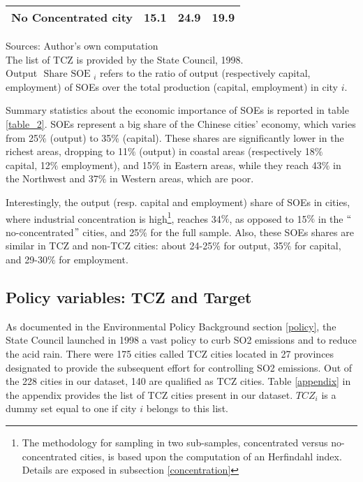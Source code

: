 \documentclass[12pt]{article}
\begin{document}
\begin{table}[!htb]
\begin{adjustbox}{width=\textwidth, totalheight=\baselineskip,keepaspectratio}
\begin{tabular}{lrrr}
No Concentrated city &             15.1 &              24.9 &                 19.9 \\
\bottomrule
\end{tabular}
\end{adjustbox}
\begin{tablenotes} 
 \small 
 \item  
Sources: Author's own computation \\
The list of TCZ is provided by the State Council, 1998. \\
Output $\text { Share SOE }_{i}$ refers to the ratio of output (respectively capital, employment) of SOEs over the total production (capital, employment) in city $i$.
 \end{tablenotes}
\end{table}



Summary statistics about the economic importance of SOEs is reported in table \ref{table_2}. SOEs represent a big share of the Chinese cities' economy, which varies from 25$\%$ (output) to 35$\%$ (capital). These shares are significantly lower in the richest areas, dropping to 11$\%$ (output) in coastal areas (respectively 18$\%$ capital, 12$\%$ employment), and 15$\%$  in Eastern areas, while they reach 43$\%$ in the Northwest and 37$\%$ in Western areas, which are poor.

Interestingly, the output (resp. capital and employment) share of SOEs in cities, where industrial concentration is high\footnote{The methodology for sampling in two sub-samples, concentrated versus no-concentrated cities, is based upon the computation of an Herfindahl index. Details are exposed in subsection \ref{concentration}}, reaches 34$\%$, as opposed to 15$\%$  in the $``$no-concentrated$"$  cities, and 25$\%$  for the full sample. Also, these SOEs shares are similar in TCZ and non-TCZ cities: about 24-25$\%$  for output, 35$\%$  for capital, and 29-30$\%$  for employment. 


\subsection{Policy variables: TCZ and Target}


As documented in the Environmental Policy Background section \ref{policy}, the State Council launched in 1998 a vast policy to curb SO2 emissions and to reduce the acid rain. There were 175 cities called TCZ cities located in 27 provinces designated to provide the subsequent effort for controlling SO2 emissions. Out of the 228 cities in our dataset, 140 are qualified as TCZ cities. Table \ref{appendix} in the appendix provides the list of TCZ cities present in our dataset. $TCZ_{i}$ is a dummy set equal to one if city $i$ belongs to this list. 
\end{document}
